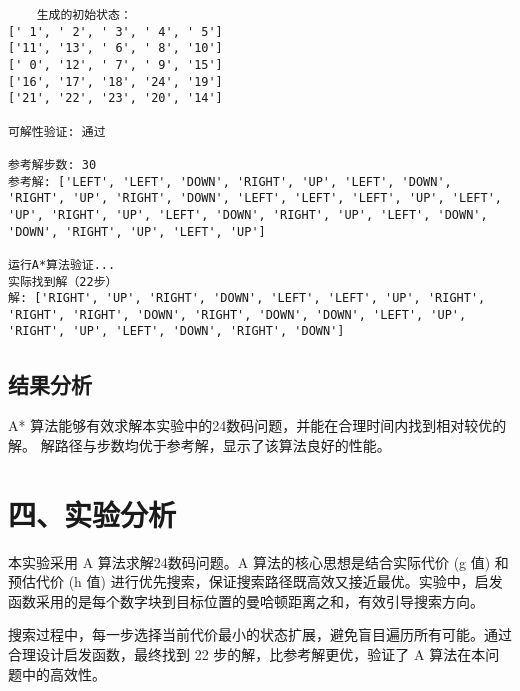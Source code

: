 \documentclass[a4paper,12pt]{article}
\begin{document}
\begin{lstlisting}
    生成的初始状态：
[' 1', ' 2', ' 3', ' 4', ' 5']
['11', '13', ' 6', ' 8', '10']
[' 0', '12', ' 7', ' 9', '15']
['16', '17', '18', '24', '19']
['21', '22', '23', '20', '14']

可解性验证: 通过

参考解步数: 30
参考解: ['LEFT', 'LEFT', 'DOWN', 'RIGHT', 'UP', 'LEFT', 'DOWN', 'RIGHT', 'UP', 'RIGHT', 'DOWN', 'LEFT', 'LEFT', 'LEFT', 'UP', 'LEFT', 'UP', 'RIGHT', 'UP', 'LEFT', 'DOWN', 'RIGHT', 'UP', 'LEFT', 'DOWN', 'DOWN', 'RIGHT', 'UP', 'LEFT', 'UP']

运行A*算法验证...
实际找到解（22步）
解: ['RIGHT', 'UP', 'RIGHT', 'DOWN', 'LEFT', 'LEFT', 'UP', 'RIGHT', 'RIGHT', 'RIGHT', 'DOWN', 'RIGHT', 'DOWN', 'DOWN', 'LEFT', 'UP', 'RIGHT', 'UP', 'LEFT', 'DOWN', 'RIGHT', 'DOWN']
\end{lstlisting}

\subsection{结果分析}
A* 算法能够有效求解本实验中的24数码问题，并能在合理时间内找到相对较优的解。
解路径与步数均优于参考解，显示了该算法良好的性能。


\section*{四、实验分析}

本实验采用 A\* 算法求解24数码问题。A\* 算法的核心思想是结合实际代价 (g 值) 和预估代价 (h 值) 进行优先搜索，保证搜索路径既高效又接近最优。实验中，启发函数采用的是每个数字块到目标位置的曼哈顿距离之和，有效引导搜索方向。

搜索过程中，每一步选择当前代价最小的状态扩展，避免盲目遍历所有可能。通过合理设计启发函数，最终找到 22 步的解，比参考解更优，验证了 A\* 算法在本问题中的高效性。
\end{document}
